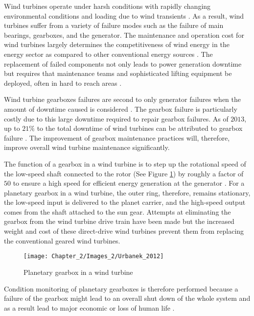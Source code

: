 Wind turbines operate under harsh conditions with rapidly changing environmental conditions and loading due to wind transients \citep{Nie2013,Salameh2018} . As a result, wind turbines suffer from a variety of failure modes such as the failure of main bearings, gearboxes, and the generator. The maintenance and operation cost for wind turbines largely determines the competitiveness of wind energy in the energy sector as compared to other conventional energy sources \citep{Nie2013}. The replacement of failed components not only leads to power generation downtime but requires that maintenance teams and sophisticated lifting equipment be deployed, often in hard to reach areas \citep{Nie2013}.

Wind turbine gearboxes failures are second to only generator failures when the amount of downtime caused is considered \citep{Salameh2018}. The gearbox failure is particularly costly due to this large downtime required to repair gearbox failures. As of $2013$, up to $21\%$ to the total downtime of wind turbines can be attributed to gearbox failure \citep{Nie2013}. The improvement of gearbox maintenance practices will, therefore, improve overall wind turbine maintenance significantly. 

The function of a gearbox in a wind turbine is to step up the rotational speed of the low-speed shaft connected to the rotor (See Figure \ref{F:Urbanek}) by roughly a factor of $50$ to ensure a high speed for efficient energy generation at the generator \citep{Salameh2018}. For a planetary gearbox in a wind turbine, the outer ring, therefore, remains stationary, the low-speed input is delivered to the planet carrier, and the high-speed output comes from the shaft attached to the sun gear. Attempts at eliminating the gearbox from the wind turbine drive train have been made \citep{Morris2011} but the increased weight and cost of these direct-drive wind turbines prevent them from replacing the conventional geared wind turbines.


\begin{figure}[H]
	\centering
	\texttt{[image: Chapter\_2/Images\_2/Urbanek\_2012]}
	\caption{Planetary gearbox in a wind turbine \citep{Urbanek2012}}
	\label{F:Urbanek}
\end{figure}



Condition monitoring of planetary gearboxes is therefore performed because a failure of the gearbox might lead to an overall shut down of the whole system and as a result lead to major economic or loss of human life \cite{Lei2014}.



